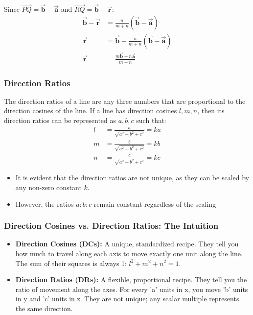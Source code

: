 \begin{frame}
 
    Since \(\vec{PQ} = \vec{\mathbf{b}} - \vec{\mathbf{a}}\) and \(\vec{RQ} = \vec{\mathbf{b}} - \vec{\mathbf{r}}\):
    \begin{align}
        \vec{\mathbf{b}} - \vec{\mathbf{r}} &= \frac{n}{m+n}(\vec{\mathbf{b}} - \vec{\mathbf{a}}) \\
        \vec{\mathbf{r}} &= \vec{\mathbf{b}} - \frac{n}{m+n}(\vec{\mathbf{b}} - \vec{\mathbf{a}}) \\
        \vec{\mathbf{r}} &= \frac{m\vec{\mathbf{b}} + n\vec{\mathbf{a}}}{m+n}
    \end{align}
  
\end{frame}

\begin{frame}
\frametitle{Direction Ratios}
    The direction ratios of a line are any three numbers that are proportional to the direction cosines of the line. If a line has direction cosines \(l, m, n\), then its direction ratios can be represented as \(a, b, c\) such that:
    \begin{align*}
        l &= \frac{a}{\sqrt{a^2 + b^2 + c^2}} =  k a \\
        m &= \frac{b}{\sqrt{a^2 + b^2 + c^2}}  = k b \\
        n &= \frac{c}{\sqrt{a^2 + b^2 + c^2}} = k c
    \end{align*}
\begin{itemize}
    \item It is evident that the direction ratios are not unique, as they can be scaled by any non-zero constant \(k\).
    \item However, the ratios \(a:b:c\) remain constant regardless of the scaling
\end{itemize}
\end{frame}

\begin{frame}
    \frametitle{Direction Cosines vs. Direction Ratios: The Intuition}
    \begin{itemize}
        \item \textbf{Direction Cosines (DCs):} A unique, standardized recipe. They tell you how much to travel along each axis to move exactly one unit along the line. The sum of their squares is always 1: \(l^2 + m^2 + n^2 = 1\).
        \item \textbf{Direction Ratios (DRs):} A flexible, proportional recipe. They tell you the ratio of movement along the axes. For every 'a' units in x, you move 'b' units in y and 'c' units in z. They are not unique; any scalar multiple represents the same direction.
    \end{itemize}
\end{frame}

